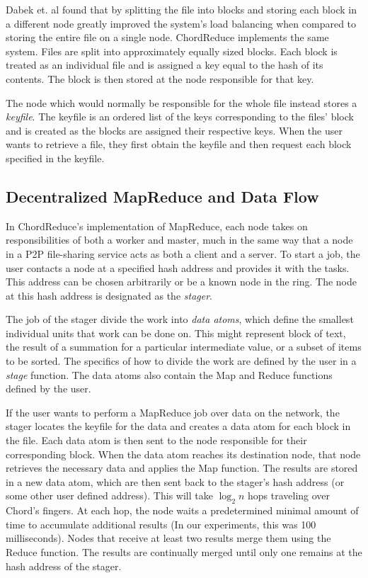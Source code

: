 Dabek et. al found that by splitting the file into blocks and storing each block in a different node greatly improved the system's load balancing when compared to storing the entire file on a single node\cite{CFS}. ChordReduce implements the same system.  Files are split into approximately equally sized blocks.  Each block is treated as an individual file and is assigned a key equal to the hash of its contents.  The block is then stored at the node responsible for that key.  

The node which would normally be responsible for the whole file instead stores a \textit{keyfile}.  The keyfile is an ordered list of the keys corresponding to the files' block and is created as the blocks are assigned their respective keys.  When the user wants to retrieve a file, they first obtain the keyfile and then request each block specified in the keyfile.



\subsection{Decentralized MapReduce and Data Flow} 
In ChordReduce's implementation of MapReduce, each node takes on responsibilities of both a worker and master, much in the same way that a node in a P2P file-sharing service acts as both a client and a server.  To start a job, the user contacts a node at a specified hash address and provides it with the tasks.  This address can be chosen arbitrarily or be a known node in the ring. The node at this hash address is designated as the \textit{stager}.  

The job of the stager divide the work into \emph{data atoms}, which define the smallest individual units that work can be done on. This might represent block of text, the result of a summation for a particular intermediate value, or a subset of items to be sorted. The specifics of how to divide the work are defined by the user in a \emph{stage} function.  The data atoms also contain the Map and Reduce functions defined by the user.

If the user wants to perform a MapReduce job over data on the network, the stager locates the keyfile for the data and creates a data atom for each block in the file.  Each data atom is then sent to the node responsible for their corresponding block.  When the data atom reaches its destination node, that node retrieves the necessary data and applies the Map function.  The results are stored in a new data atom,  which are then sent back to the stager's hash address (or some other user defined address).  This will take $\log_{2} n$ hops traveling over Chord's fingers.  At each hop, the node waits a predetermined minimal amount of time to accumulate additional results (In our experiments, this was 100 milliseconds).  Nodes that receive at least two results merge them using the Reduce function.  The results are continually merged until only one remains at the hash address of the stager. 



